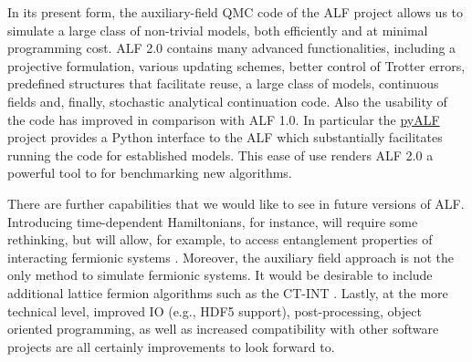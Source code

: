 
In its present form, the  auxiliary-field QMC code of the ALF project allows us to simulate a large class of non-trivial models, both efficiently and at minimal  programming cost.  ALF 2.0 contains many advanced functionalities, including a projective formulation, various updating schemes, better control of Trotter errors, predefined structures that facilitate reuse, a large class of models, continuous fields and, finally, stochastic analytical continuation code. Also the usability of the code has improved in comparison with ALF 1.0. In particular the \href{https://git.physik.uni-wuerzburg.de/ALF/pyALF}{pyALF} project provides a Python interface to the ALF which substantially facilitates running the code for established models.  This ease of use renders ALF 2.0 a  powerful  tool to for benchmarking new algorithms. 

There are further capabilities that we would like to see in future versions of ALF. Introducing time-dependent Hamiltonians, for instance, will require some rethinking, but will allow, for example, to access entanglement properties of interacting fermionic systems \cite{Broecker14,Assaad13a,Assaad15}. Moreover, the auxiliary field approach is not the only method to simulate fermionic systems.
It would be desirable to include additional lattice fermion algorithms such as the CT-INT \cite{Rubtsov05,Assaad07}.
Lastly, at the more technical level, improved IO (e.g., HDF5 support), post-processing, object oriented programming, as well as increased compatibility with other software projects are all certainly improvements to look forward to. 
